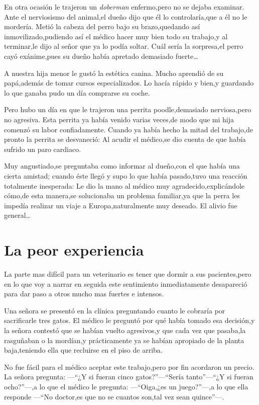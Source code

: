 \documentclass[letterpaper,12pt]{book}
\begin{document}
En otra ocasión le trajeron un \textit{doberman} enfermo,pero no se dejaba examinar. Ante el nerviosismo del animal,el dueño dijo que él lo controlaría,que a él no le mordería. Metió la cabeza del perro bajo su brazo,quedando así inmovilizado,pudiendo así el médico hacer muy bien todo su trabajo,y al terminar,le dijo al señor que ya lo podía soltar. Cuál sería la sorpresa,el perro cayó exánime,pues su dueño había apretado demasiado fuerte\ldots


A nuestra hija menor le gustó la estética canina. Mucho aprendió de su papá,además de tomar cursos especializados. Lo hacía rápido y bien,y guardando lo que ganaba pudo un día comprarse su coche.

Pero hubo un día en que le trajeron una perrita poodle,demasiado nerviosa,pero no agresiva. Esta perrita ya había venido varias veces,de modo que mi hija comenzó su labor confiadamente. Cuando ya había hecho la mitad del trabajo,de pronto la perrita se desvaneció: Al acudir el médico,se dio cuenta de que había sufrido un paro cardiaco. 

Muy angustiado,se preguntaba como informar al dueño,con el que había una cierta amistad; cuando éste llegó y supo lo que había pasado,tuvo una reacción totalmente inesperada: Le dio la mano al médico muy agradecido,explicándole cómo,de esta manera,se solucionaba un problema familiar,ya que la perra les impedía realizar un viaje a Europa,naturalmente muy deseado. El alivio fue general\ldots

\chapter{La peor experiencia}

La parte mas difícil para un veterinario es tener que dormir a sus pacientes,pero en lo que voy a narrar en seguida este sentimiento inmediatamente desapareció para dar paso a otros mucho mas fuertes e intensos.

Una señora se presentó en la clínica preguntando cuanto le cobraría por sacrificarle tres gatos. El médico le preguntó por qué había tomado esa decisión,y la señora contestó que se habían vuelto agresivos,y que cada vez que pasaba,la rasguñaban o la mordían,y prácticamente ya se habían apropiado de la planta baja,teniendo ella que recluirse en el piso de arriba.

No fue fácil para el médico aceptar este trabajo,pero por fin acordaron un precio. La señora pregunta: ---``¿Y si fueran cinco gatos?''---``Sería tanto''---``¿Y si fueran ocho?''---,a lo que el médico le pregunta: ---``Oiga,¿es un juego?''---,a lo que ella responde ---``No doctor,es que no se cuantos son,tal vez sean quince''---. 
\end{document}

